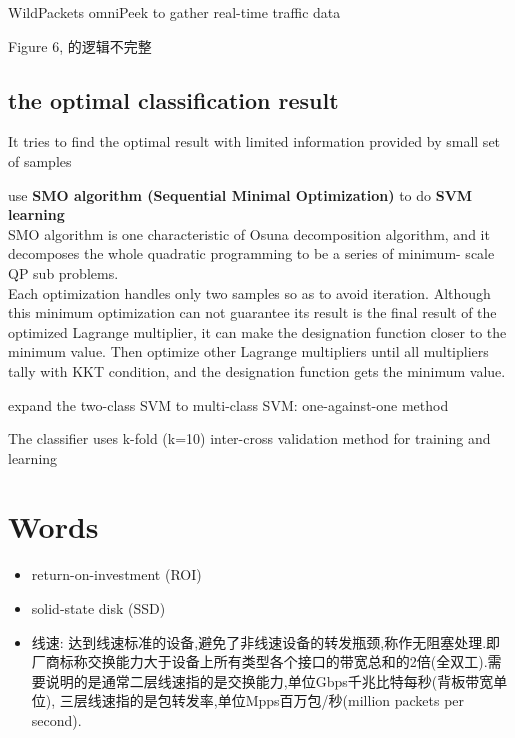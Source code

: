 \documentclass{article}
\begin{document}
WildPackets omniPeek to gather real-time traffic data

Figure 6, 的逻辑不完整

\subsection{the optimal classification result}\label{the-optimal-classification-result}
It tries to find the optimal result with limited information provided by small set of samples

use \textbf{SMO algorithm (Sequential Minimal Optimization)} to do \textbf{SVM learning}\\
SMO algorithm is one characteristic of Osuna decomposition algorithm, and it decomposes the whole quadratic programming to be a series of minimum- scale QP sub problems.\\
Each optimization handles only two samples so as to avoid iteration. Although this minimum optimization can not guarantee its result is the final result of the optimized Lagrange multiplier, it can make the designation function closer to the minimum value. Then optimize other Lagrange multipliers until all multipliers tally with KKT condition, and the designation function gets the minimum value.

expand the two-class SVM to multi-class SVM: one-against-one method

The classifier uses k-fold (k=10) inter-cross validation method for training and learning

\section{Words}\label{words}
\begin{itemize}
\item return-on-investment (ROI)
\item solid-state disk (SSD)
\item 线速:
  达到线速标准的设备,避免了非线速设备的转发瓶颈,称作无阻塞处理.即厂商标称交换能力大于设备上所有类型各个接口的带宽总和的2倍(全双工).需要说明的是通常二层线速指的是交换能力,单位Gbps千兆比特每秒(背板带宽单位), 三层线速指的是包转发率,单位Mpps百万包/秒(million packets per second).
\end{itemize}
\end{document}
